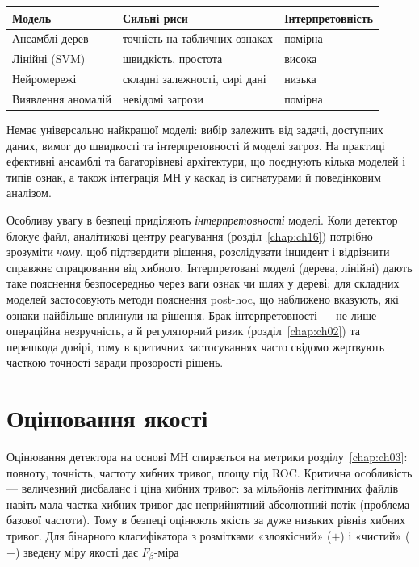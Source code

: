 
\begin{center}\footnotesize
\begin{tabularx}{\linewidth}{L{24mm} Y L{18mm}}
\toprule
Модель & Сильні риси & Інтерпретовність \\
\midrule
Ансамблі дерев & точність на табличних ознаках & помірна \\
Лінійні (SVM) & швидкість, простота & висока \\
Нейромережі & складні залежності, сирі дані & низька \\
Виявлення аномалій & невідомі загрози & помірна \\
\bottomrule
\end{tabularx}
\end{center}

Немає універсально найкращої моделі: вибір залежить від задачі, доступних даних, вимог до швидкості та інтерпретовності й моделі загроз. На практиці ефективні ансамблі та багаторівневі архітектури, що поєднують кілька моделей і типів ознак, а також інтеграція МН у каскад із сигнатурами й поведінковим аналізом.

Особливу увагу в безпеці приділяють \emph{інтерпретовності} моделі. Коли детектор блокує файл, аналітикові центру реагування (розділ~\ref{chap:ch16}) потрібно зрозуміти \emph{чому}, щоб підтвердити рішення, розслідувати інцидент і відрізнити справжнє спрацювання від хибного. Інтерпретовані моделі (дерева, лінійні) дають таке пояснення безпосередньо через ваги ознак чи шлях у дереві; для складних моделей застосовують методи пояснення post-hoc, що наближено вказують, які ознаки найбільше вплинули на рішення. Брак інтерпретовності --- не лише операційна незручність, а й регуляторний ризик (розділ~\ref{chap:ch02}) та перешкода довірі, тому в критичних застосуваннях часто свідомо жертвують часткою точності заради прозорості рішень.

\section{Оцінювання якості}\label{sec:ch09-eval}

Оцінювання детектора на основі МН спирається на метрики розділу~\ref{chap:ch03}: повноту, точність, частоту хибних тривог, площу під ROC. Критична особливість --- величезний дисбаланс і ціна хибних тривог: за мільйонів легітимних файлів навіть мала частка хибних тривог дає неприйнятний абсолютний потік (проблема базової частоти). Тому в безпеці оцінюють якість за дуже низьких рівнів хибних тривог. Для бінарного класифікатора з розмітками «злоякісний» ($+$) і «чистий» ($-$) зведену міру якості дає $F_\beta$-міра


